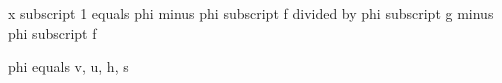 x subscript 1 equals phi minus phi subscript f divided by phi subscript g minus phi subscript f  

phi equals v, u, h, s